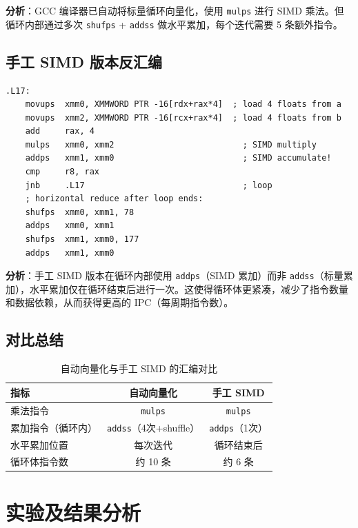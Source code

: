 \documentclass[a4paper]{article}
\begin{document}
\textbf{分析}：GCC 编译器已自动将标量循环向量化，使用 \texttt{mulps} 进行 SIMD 乘法。但循环内部通过多次 \texttt{shufps} + \texttt{addss} 做水平累加，每个迭代需要 5 条额外指令。

\subsection{手工 SIMD 版本反汇编}

\begin{lstlisting}[language={[x86masm]Assembler}, title=simd\_dot 反汇编]
.L17:
    movups  xmm0, XMMWORD PTR -16[rdx+rax*4]  ; load 4 floats from a
    movups  xmm2, XMMWORD PTR -16[rcx+rax*4]  ; load 4 floats from b
    add     rax, 4
    mulps   xmm0, xmm2                          ; SIMD multiply
    addps   xmm1, xmm0                          ; SIMD accumulate!
    cmp     r8, rax
    jnb     .L17                                ; loop
    ; horizontal reduce after loop ends:
    shufps  xmm0, xmm1, 78
    addps   xmm0, xmm1
    shufps  xmm1, xmm0, 177
    addps   xmm1, xmm0
\end{lstlisting}

\textbf{分析}：手工 SIMD 版本在循环内部使用 \texttt{addps}（SIMD 累加）而非 \texttt{addss}（标量累加），水平累加仅在循环结束后进行一次。这使得循环体更紧凑，减少了指令数量和数据依赖，从而获得更高的 IPC（每周期指令数）。

\subsection{对比总结}

\begin{table}[!htbp]
  \centering
  \begin{tabular}{lcc}
  \toprule
  指标 & 自动向量化 & 手工 SIMD \\
  \midrule
  乘法指令 & \texttt{mulps} & \texttt{mulps} \\
  累加指令（循环内）& \texttt{addss}（4次+shuffle）& \texttt{addps}（1次） \\
  水平累加位置 & 每次迭代 & 循环结束后 \\
  循环体指令数 & 约 10 条 & 约 6 条 \\
  \bottomrule
  \end{tabular}
  \caption{自动向量化与手工 SIMD 的汇编对比}
\end{table}

\section{实验及结果分析}
\end{document}
